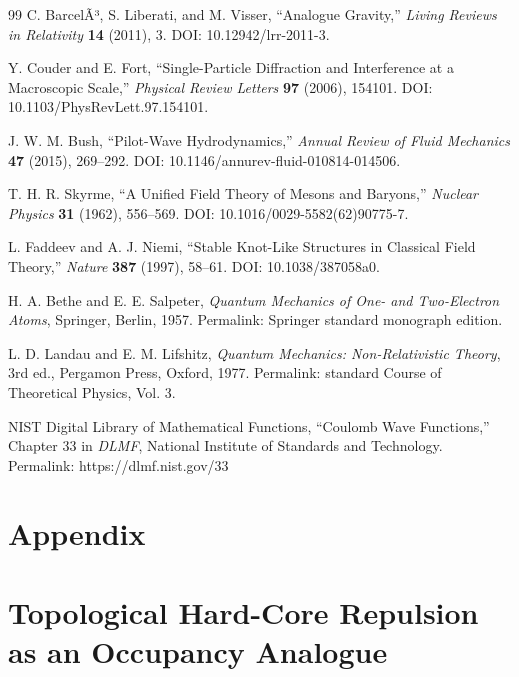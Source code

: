 \documentclass[11pt,a4paper]{article}
\begin{document}
\begin{thebibliography}{99}
        C. BarcelÃ³, S. Liberati, and M. Visser,
        ``Analogue Gravity,''
        \textit{Living Reviews in Relativity} \textbf{14} (2011), 3.
        DOI: 10.12942/lrr-2011-3.
        
        Y. Couder and E. Fort,
        ``Single-Particle Diffraction and Interference at a Macroscopic Scale,''
        \textit{Physical Review Letters} \textbf{97} (2006), 154101.
        DOI: 10.1103/PhysRevLett.97.154101.
        
        J. W. M. Bush,
        ``Pilot-Wave Hydrodynamics,''
        \textit{Annual Review of Fluid Mechanics} \textbf{47} (2015), 269--292.
        DOI: 10.1146/annurev-fluid-010814-014506.
        
        T. H. R. Skyrme,
        ``A Unified Field Theory of Mesons and Baryons,''
        \textit{Nuclear Physics} \textbf{31} (1962), 556--569.
        DOI: 10.1016/0029-5582(62)90775-7.
        
        L. Faddeev and A. J. Niemi,
        ``Stable Knot-Like Structures in Classical Field Theory,''
        \textit{Nature} \textbf{387} (1997), 58--61.
        DOI: 10.1038/387058a0.
        
        H. A. Bethe and E. E. Salpeter,
        \textit{Quantum Mechanics of One- and Two-Electron Atoms},
        Springer, Berlin, 1957.
        Permalink: Springer standard monograph edition.
        
        L. D. Landau and E. M. Lifshitz,
        \textit{Quantum Mechanics: Non-Relativistic Theory},
        3rd ed., Pergamon Press, Oxford, 1977.
        Permalink: standard Course of Theoretical Physics, Vol. 3.
        
        NIST Digital Library of Mathematical Functions,
        ``Coulomb Wave Functions,''
        Chapter 33 in \textit{DLMF},
        National Institute of Standards and Technology.
        Permalink: https://dlmf.nist.gov/33

    
    \end{thebibliography}
    
\appendix \section*{Appendix}
    \section{Topological Hard-Core Repulsion as an Occupancy Analogue}
    \label{app:PauliBarrier}
    
\end{document}
